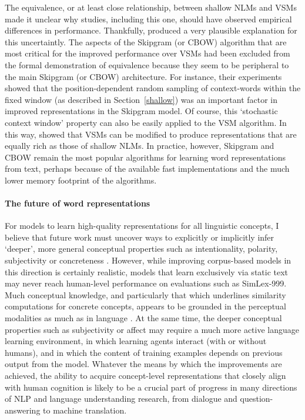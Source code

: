 The equivalence, or at least close relationship, between shallow NLMs and VSMs made it unclear why studies, including this one, should have observed empirical differences in performance. Thankfully, \cite{levy2015improving} produced a very plausible explanation for this uncertaintly. The aspects of the Skipgram (or CBOW) algorithm that are most critical for the improved performance over VSMs had been excluded from the formal demonstration of equivalence because they seem to be peripheral to the main Skipgram (or CBOW) architecture. For instance, their experiments showed that the position-dependent random sampling of context-words within the fixed window (as described in Section~\ref{shallow}) was an important factor in improved representations in the Skipgram model. Of course, this `stochastic context window' property can also be easily applied to the VSM algorithm. In this way, \cite{levy2015improving} showed that VSMs can be modified to produce representations that are equally rich as those of shallow NLMs. In practice, however, Skipgram and CBOW remain the most popular algorithms for learning word representations from text, perhaps because of the available fast implementations and the much lower memory footprint of the algorithms.    

\paragraph{The future of word representations} For models to learn high-quality representations for all linguistic concepts, I believe that future work must uncover ways to explicitly or implicitly infer `deeper', more general conceptual properties such as intentionality, polarity, subjectivity or concreteness \citep{gershmanmetaphor}. However, while improving corpus-based models in this direction is certainly realistic, models that learn exclusively via static text may never reach human-level performance on evaluations such as SimLex-999. Much conceptual knowledge, and particularly that which underlines similarity computations for concrete concepts, appears to be grounded in the perceptual modalities as much as in language \citep{barsalou2003grounding}. At the same time, the deeper conceptual properties such as subjectivity or affect may require a much more active language learning environment, in which learning agents interact (with or without humans), and in which the content of training examples depends on previous output from the model. Whatever the means by which the improvements are achieved, the ability to acquire concept-level representations that closely align with human cognition is likely to be a crucial part of progress in many directions of NLP and language understanding research, from dialogue and question-answering to machine translation. 

